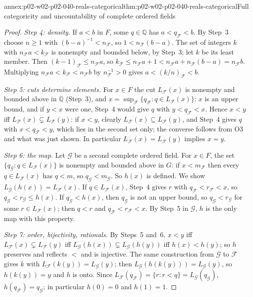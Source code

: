 \begin{annexitem}{annex:p02-w02-p02-040-reals-categorical}{thm:p02-w02-p02-040-reals-categorical}{Full categoricity and uncountability of complete ordered fields}
\begin{proof}
\emph{Step 4: density.}  If \(a<b\) in \(F\), some \(q\in\mathbb Q\) has
\(a<q_{\mathcal F}<b\).  By Step~3 choose \(n\geq1\) with
\((b-a)^{-1}<n_{\mathcal F}\), so \(1<n_{\mathcal F}(b-a)\).  The set of
integers \(k\) with \(n_{\mathcal F}a<k_{\mathcal F}\) is nonempty and bounded
below, by Step~3; let \(k\) be its least member.  Then
\((k-1)_{\mathcal F}\le n_{\mathcal F}a\), so
\(k_{\mathcal F}\le n_{\mathcal F}a+1<n_{\mathcal F}a+n_{\mathcal F}(b-a)=n_{\mathcal F}b\).
Multiplying \(n_{\mathcal F}a<k_{\mathcal F}<n_{\mathcal F}b\) by
\(n_{\mathcal F}^{-1}>0\) gives \(a<(k/n)_{\mathcal F}<b\).

\emph{Step 5: cuts determine elements.}  For \(x\in F\) the cut
\(L_{\mathcal F}(x)\) is nonempty and bounded above in \(\mathbb Q\) (Step~3),
and \(x=\sup_{\mathcal F}\{q_{\mathcal F}:q\in L_{\mathcal F}(x)\}\): \(x\) is
an upper bound, and if \(y<x\) were one, Step~4 would give \(q\) with
\(y<q_{\mathcal F}<x\).  Hence \(x<y\) iff \(L_{\mathcal F}(x)\subsetneq L_{\mathcal F}(y)\):
if \(x<y\), clearly \(L_{\mathcal F}(x)\subseteq L_{\mathcal F}(y)\), and Step~4
gives \(q\) with \(x<q_{\mathcal F}<y\), which lies in the second set only;
the converse follows from O3 and what was just shown.  In particular
\(L_{\mathcal F}(x)=L_{\mathcal F}(y)\) implies \(x=y\).

\emph{Step 6: the map.}  Let \(\mathcal G\) be a second complete ordered
field.  For \(x\in F\), the set \(\{q_{\mathcal G}:q\in L_{\mathcal F}(x)\}\)
is nonempty and bounded above in \(G\): if \(x<m_{\mathcal F}\) then every
\(q\in L_{\mathcal F}(x)\) has \(q<m\), so \(q_{\mathcal G}<m_{\mathcal G}\).  So
\(h(x)\) is defined.  We show \(L_{\mathcal G}(h(x))=L_{\mathcal F}(x)\).  If
\(q\in L_{\mathcal F}(x)\), Step~4 gives \(r\) with \(q_{\mathcal F}<r_{\mathcal F}<x\),
so \(q_{\mathcal G}<r_{\mathcal G}\le h(x)\).  If \(q_{\mathcal G}<h(x)\), then
\(q_{\mathcal G}\) is not an upper bound, so \(q_{\mathcal G}<r_{\mathcal G}\) for
some \(r\in L_{\mathcal F}(x)\); then \(q<r\) and \(q_{\mathcal F}<r_{\mathcal F}<x\).
By Step~5 in \(\mathcal G\), \(h\) is the only map with this property.

\emph{Step 7: order, bijectivity, rationals.}  By Steps~5 and~6,
\(x<y\) iff \(L_{\mathcal F}(x)\subsetneq L_{\mathcal F}(y)\) iff
\(L_{\mathcal G}(h(x))\subsetneq L_{\mathcal G}(h(y))\) iff \(h(x)<h(y)\); so
\(h\) preserves and reflects \(<\) and is injective.  The same construction
from \(\mathcal G\) to \(\mathcal F\) gives \(k\) with
\(L_{\mathcal F}(k(y))=L_{\mathcal G}(y)\); then
\(L_{\mathcal G}(h(k(y)))=L_{\mathcal G}(y)\), so \(h(k(y))=y\) and \(h\) is
onto.  Since \(L_{\mathcal F}(q_{\mathcal F})=\{r:r<q\}=L_{\mathcal G}(q_{\mathcal G})\),
\(h(q_{\mathcal F})=q_{\mathcal G}\); in particular \(h(0)=0\) and \(h(1)=1\).


\end{proof}
\end{annexitem}
